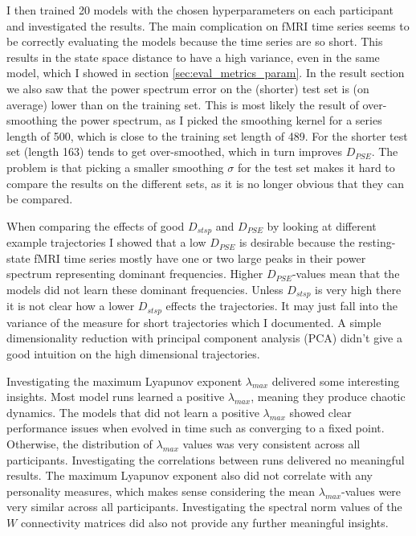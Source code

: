 I then trained 20 models with the chosen hyperparameters on each participant and investigated the results. The main complication on fMRI time series seems to be correctly evaluating 
the models because the time series are so short. This results in the state space distance to have a high variance, even in the same model, which I showed in 
section \ref{sec:eval_metrics_param}. In the result section we also saw that the power spectrum error on the (shorter) test set is (on average) lower than on the 
training set. This is most likely the result of over-smoothing the power spectrum, as I picked the smoothing kernel for a series length of 500, which is close to the training set 
length of 489. For the shorter test set (length 163) tends to get over-smoothed, which in turn improves $D_{PSE}$. The problem is that picking a smaller smoothing $\sigma$ for 
the test set makes it hard to compare the results on the different sets, as it is no longer obvious that they can be compared.

When comparing the effects of good $D_{stsp}$ and $D_{PSE}$ by looking at different example trajectories I showed that a low $D_{PSE}$ is desirable because the resting-state fMRI
time series mostly have one or two large peaks in their power spectrum representing dominant frequencies. Higher $D_{PSE}$-values mean that the models did not learn these dominant 
frequencies. Unless $D_{stsp}$ is very high there it is not clear how a lower $D_{stsp}$ effects the trajectories. It may just fall into the variance of the measure for 
short trajectories which I documented. A simple dimensionality reduction with principal component analysis (PCA) didn't give a good intuition on the high dimensional trajectories.

Investigating the maximum Lyapunov exponent $\lambda_{max}$ delivered some interesting insights. Most model runs learned a positive $\lambda_{max}$, meaning they produce chaotic 
dynamics. The models that did not learn a positive $\lambda_{max}$ showed clear performance issues when evolved in time such as converging to a fixed point. Otherwise, the distribution of 
$\lambda_{max}$ values was very consistent across all participants. Investigating the correlations between runs delivered no meaningful results. The maximum Lyapunov exponent 
also did not correlate with any personality measures, which makes sense considering the mean $\lambda_{max}$-values were very similar across all participants. Investigating
the spectral norm values of the $W$ connectivity matrices did also not provide any further meaningful insights.

